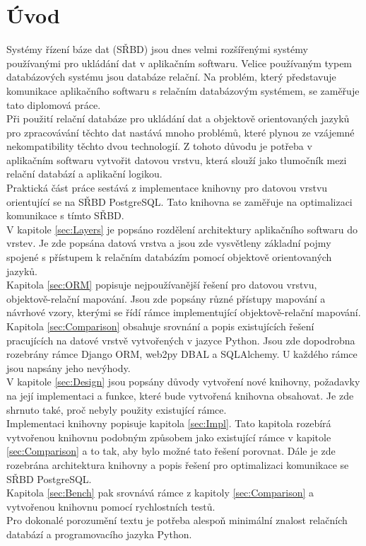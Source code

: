 \documentclass[ing,male,java,dept456]{diploma}						%
\begin{document}
\section{Úvod}
\label{sec:Intro}
Systémy řízení báze dat (SŘBD) jsou dnes velmi rozšířenými systémy používanými pro ukládání dat v aplikačním softwaru. Velice používaným typem databázových systému jsou databáze relační. Na problém, který představuje komunikace aplikačního softwaru s relačním databázovým systémem, se zaměřuje tato diplomová práce. \\
Při použití relační databáze pro ukládání dat a objektově orientovaných jazyků pro zpracovávání těchto dat nastává mnoho problémů, které plynou ze vzájemné nekompatibility těchto dvou technologií. Z tohoto důvodu je potřeba v aplikačním softwaru vytvořit datovou vrstvu, která slouží jako tlumočník mezi relační databází a aplikační logikou. \\
Praktická část práce sestává z implementace knihovny pro datovou vrstvu orientující se na SŘBD PostgreSQL. Tato knihovna se zaměřuje na optimalizaci komunikace s tímto SŘBD. \\
V kapitole \ref{sec:Layers} je popsáno rozdělení architektury aplikačního softwaru do vrstev. Je zde popsána datová vrstva a jsou zde vysvětleny základní pojmy spojené s přístupem k relačním databázím pomocí objektově orientovaných jazyků. \\
Kapitola \ref{sec:ORM} popisuje nejpoužívanější řešení pro datovou vrstvu, objektově-relační mapování. Jsou zde popsány různé přístupy mapování a návrhové vzory, kterými se řídí rámce implementující objektově-relační mapování. \\
Kapitola \ref{sec:Comparison} obsahuje srovnání a popis existujících řešení pracujících na datové vrstvě vytvořených v jazyce Python. Jsou zde dopodrobna rozebrány rámce Django ORM, web2py DBAL a SQLAlchemy. U každého rámce jsou napsány jeho nevýhody. \\
V kapitole \ref{sec:Design} jsou popsány důvody vytvoření nové knihovny, požadavky na její implementaci a funkce, které bude vytvořená knihovna obsahovat. Je zde shrnuto také, proč nebyly použity existující rámce. \\
Implementaci knihovny popisuje kapitola \ref{sec:Impl}. Tato kapitola rozebírá vytvořenou knihovnu podobným způsobem jako existující rámce v kapitole \ref{sec:Comparison} a to tak, aby bylo možné tato řešení porovnat. Dále je zde rozebrána architektura knihovny a popis řešení pro optimalizaci komunikace se SŘBD PostgreSQL. \\
Kapitola \ref{sec:Bench} pak srovnává rámce z kapitoly \ref{sec:Comparison} a vytvořenou knihovnu pomocí rychlostních testů. \\
Pro dokonalé porozumění textu je potřeba alespoň minimální znalost relačních databází a programovacího jazyka Python.
\end{document}
